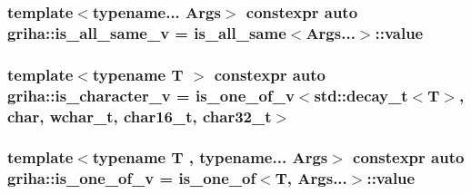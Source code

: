 \subsubsection[{\texorpdfstring{is\+\_\+all\+\_\+same\+\_\+v}{is_all_same_v}}]{\setlength{\rightskip}{0pt plus 5cm}template$<$typename... Args$>$ constexpr auto griha\+::is\+\_\+all\+\_\+same\+\_\+v = {\bf is\+\_\+all\+\_\+same}$<$Args...$>$\+::value}\hypertarget{namespacegriha_a3c9eb374b11b670884dfabc46b7bbc23}{}\label{namespacegriha_a3c9eb374b11b670884dfabc46b7bbc23}
\subsubsection[{\texorpdfstring{is\+\_\+character\+\_\+v}{is_character_v}}]{\setlength{\rightskip}{0pt plus 5cm}template$<$typename T $>$ constexpr auto griha\+::is\+\_\+character\+\_\+v = {\bf is\+\_\+one\+\_\+of\+\_\+v}$<$std\+::decay\+\_\+t$<$T$>$, char, wchar\+\_\+t, char16\+\_\+t, char32\+\_\+t$>$}\hypertarget{namespacegriha_af6e5a84a5dad7d2123491eb7124aa2e3}{}\label{namespacegriha_af6e5a84a5dad7d2123491eb7124aa2e3}
\subsubsection[{\texorpdfstring{is\+\_\+one\+\_\+of\+\_\+v}{is_one_of_v}}]{\setlength{\rightskip}{0pt plus 5cm}template$<$typename T , typename... Args$>$ constexpr auto griha\+::is\+\_\+one\+\_\+of\+\_\+v = {\bf is\+\_\+one\+\_\+of}$<$T, Args...$>$\+::value}\hypertarget{namespacegriha_a4143946f18648e253a58b1ecd283a657}{}\label{namespacegriha_a4143946f18648e253a58b1ecd283a657}

